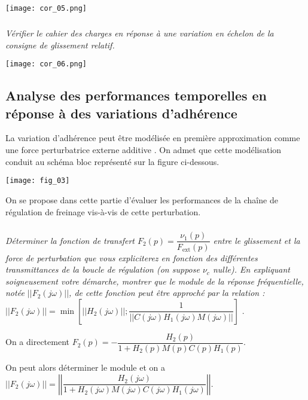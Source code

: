 \begin{multicols}{2}
\begin{corrige}
\begin{center}
\texttt{[image: cor\_05.png]}
\end{center}
\end{corrige}
\else
\fi


\subparagraph{}\textbf{ \; }\textit{Vérifier le cahier des charges en réponse à une variation en échelon de la consigne de glissement relatif.}
\ifprof
\begin{corrige}
\begin{center}
\texttt{[image: cor\_06.png]}
\end{center}
\end{corrige}
\else
\fi

\subsection*{Analyse des performances temporelles en réponse à des variations d’adhérence}
\ifprof
\else
La variation d’adhérence peut être modélisée en première approximation comme une force perturbatrice externe additive . On admet que cette modélisation conduit au schéma bloc représenté sur la figure ci-dessous.

\begin{center}
\texttt{[image: fig\_03]}
\end{center}

On se propose dans cette partie d’évaluer les performances de la chaîne de régulation de freinage vis-à-vis de cette perturbation.

\fi

\subparagraph{}\textit{Déterminer la fonction de transfert $F_2(p)=\dfrac{\nu_1(p)}{F_{\text{ext}}(p)}$ entre le glissement
et la force de perturbation que vous expliciterez en fonction des différentes
transmittances de la boucle de régulation (on suppose $\nu_c$ nulle). En expliquant soigneusement
votre démarche, montrer que le module de la réponse fréquentielle, notée $||F_2(j \omega)||$, de cette fonction peut être approché par la relation :
$||F_2(j \omega)|| = \min \left[ ||H_2(j \omega) || ; \dfrac{1}{||C(j\omega) H_1(j \omega) M(j\omega)||}\right]$ }.

\ifprof
\begin{corrige}
On a directement $F_2(p)=-\dfrac{H_2(p)}{1+H_2(p)M(p)C(p)H_1(p)}$.

On peut alors déterminer le module et on a $||F_2(j\omega)||=\left|\left|\dfrac{H_2(j\omega)}{1+H_2(j\omega)M(j\omega)C(j\omega)H_1(j\omega)}\right|\right|$. 


\end{corrige}
\end{multicols}
